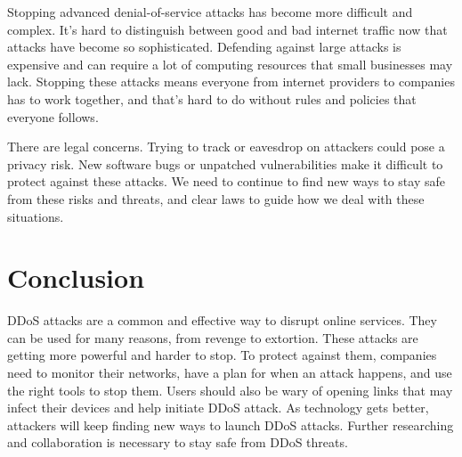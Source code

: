 \documentclass[a4paper, 12pt]{report} %
\begin{document}
                    Stopping advanced denial-of-service attacks has become more difficult and complex. It’s hard to distinguish between good and bad internet traffic now that attacks have become so sophisticated. Defending against large attacks is expensive and can require a lot of computing resources that small businesses may lack. Stopping these attacks means everyone from internet providers to companies has to work together, and that’s hard to do without rules and policies that everyone follows.
                    
                    There are legal concerns. Trying to track or eavesdrop on attackers could pose a privacy risk. New software bugs or unpatched vulnerabilities make it difficult to protect against these attacks. We need to continue to find new ways to stay safe from these risks and threats, and clear laws to guide how we deal with these situations.

                    \section{Conclusion}
                    DDoS attacks are a common and effective way to disrupt online services. They can be used for many reasons, from revenge to extortion. These attacks are getting more powerful and harder to stop. To protect against them, companies need to monitor their networks, have a plan for when an attack happens, and use the right tools to stop them. Users should also be wary of opening links that may infect their devices and help initiate DDoS attack. As technology gets better, attackers will keep finding new ways to launch DDoS attacks. Further researching and collaboration is necessary to stay safe from DDoS threats.



            

       \printbibliography
    
\end{document}
